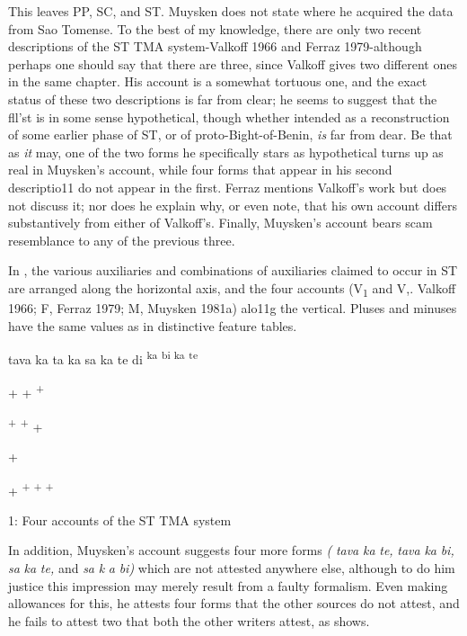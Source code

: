 This leaves PP, SC, and ST. Muysken does not state where he acquired the data from Sao Tomense. To the best of my knowledge, there are only two recent descriptions of the ST TMA system-Valkoff 1966 and Ferraz 1979-although perhaps one should say that there are three, since Valkoff gives two different ones in the same chapter. His account is a somewhat tortuous one, and the exact status of these two descriptions is far from clear; he seems to suggest that the fll'st is in some sense hypothetical, though whether intended as a reconstruc\-tion of some earlier phase of ST, or of proto-Bight-of-Benin, \textit{is} far from dear. Be that as \textit{it} may, one of the two forms he specifically stars as hypothetical turns up as real in Muysken's account, while four forms that appear in his second descriptio11 do not appear in the first. Ferraz mentions Valkoff's work but does not discuss it; nor does he explain why, or even note, that his own account differs substantively from either of Valkoff's. Finally, Muysken's account bears scam resemblance to any of the previous three.

In %
, the various auxiliaries and combinations of auxiliaries claimed to occur in ST are arranged along the horizontal axis, and the four accounts (V\textsubscript{1} and V,. Valkoff 1966; F, Ferraz 1979; M, Muysken 1981a) alo11g the vertical. Pluses and minuses have the same values as in distinctive feature tables.

\begin{table}

tava ka ta ka sa ka te di \textsuperscript{ka} \textsuperscript{bi ka} \textsuperscript{te}

+ + \textsuperscript{+}

\textsuperscript{+ }\textsuperscript{+ }+

+

+ \textsuperscript{+ + +}

\caption{1: Four accounts of the ST TMA system}
\label{tab:2.1}
\end{table}

In addition, Muysken's account suggests four more forms \textit{(} \textit{tava} \textit{ka} \textit{te,} \textit{tava} \textit{ka} \textit{bi,} \textit{sa} \textit{ka} \textit{te,} and \textit{sa} \textit{k} \textit{a} \textit{bi}\textit{)} which are not attested anywhere else, although to do him justice this impression may merely result from a faulty formalism. Even making allowances for this, he attests four forms that the other sources do not attest, and he fails to attest two that both the other writers attest, as  shows.

